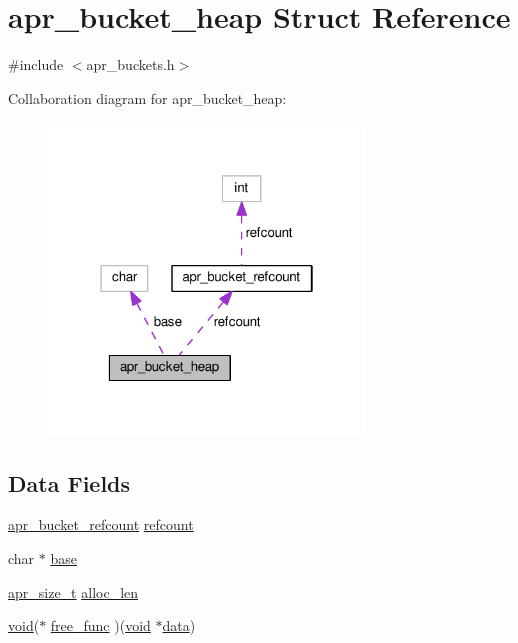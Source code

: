 \hypertarget{structapr__bucket__heap}{}\section{apr\+\_\+bucket\+\_\+heap Struct Reference}
\label{structapr__bucket__heap}


{\ttfamily \#include $<$apr\+\_\+buckets.\+h$>$}



Collaboration diagram for apr\+\_\+bucket\+\_\+heap\+:
\nopagebreak
\begin{figure}[H]
\begin{center}
\leavevmode
\includegraphics[width=238pt]{structapr__bucket__heap__coll__graph}
\end{center}
\end{figure}
\subsection*{Data Fields}
\begin{DoxyCompactItemize}
\item 
\hyperlink{structapr__bucket__refcount}{apr\+\_\+bucket\+\_\+refcount} \hyperlink{structapr__bucket__heap_ab87003dea25caef69aa3b30a1948024e}{refcount}
\item 
char $\ast$ \hyperlink{structapr__bucket__heap_ac6386e2f635c6af19075123749e1fa71}{base}
\item 
\hyperlink{group__apr__platform_gaaa72b2253f6f3032cefea5712a27540e}{apr\+\_\+size\+\_\+t} \hyperlink{structapr__bucket__heap_ae373dada96f2e005a6aaf80e41c4cf6d}{alloc\+\_\+len}
\item 
\hyperlink{group__MOD__ISAPI_gacd6cdbf73df3d9eed42fa493d9b621a6}{void}($\ast$ \hyperlink{structapr__bucket__heap_ad180e40bfdc962bab946f764be9f6f88}{free\+\_\+func} )(\hyperlink{group__MOD__ISAPI_gacd6cdbf73df3d9eed42fa493d9b621a6}{void} $\ast$\hyperlink{structdata}{data})
\end{DoxyCompactItemize}


